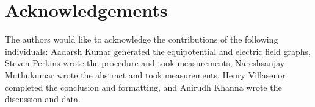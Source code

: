 ﻿\documentclass[10pt,journal]{IEEEtran}
\begin{document}
        
        
        
        
\section{Acknowledgements}
The authors would like to acknowledge the contributions of the following individuals: Aadarsh Kumar generated the equipotential and electric field graphs, Steven Perkins wrote the procedure and took measurements, Nareshsanjay Muthukumar wrote the abstract and took measurements, Henry Villasenor completed the conclusion and formatting, and Anirudh Khanna wrote the discussion and data.





\end{document}
